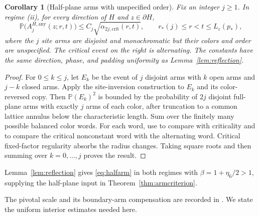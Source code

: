 \documentclass[11pt]{amsart}
\newtheorem{corollary}[theorem]{Corollary}
\theoremstyle{remark}
\newcommand{\Prob}{\mathbb P}
\begin{document}
\begin{corollary}[Half-plane arms with unspecified order]\label{cor:generalreflection}
Fix an integer $j\ge1$.  In regime (ii), for every direction of $H$ and
$z\in\partial H$,
\[
 \Prob\bigl(A_j^{H,\mathrm{any}}(z;r,t)\bigr)
 \le C_j\sqrt{\alpha_{2j,\mathrm{crit}}(r,t)},
 \qquad r_*(j)\le r<t\le L_\varepsilon(p_*),
\]
where the $j$ site arms are disjoint and monochromatic but their colors
and order are unspecified.  The critical event on the right is alternating.
The constants have the same direction, phase, and padding uniformity as
Lemma~\ref{lem:reflection}.
\end{corollary}
\begin{proof}
For $0\le k\le j$, let $E_k$ be the event of $j$ disjoint arms with
$k$ open arms and $j-k$ closed arms.
Apply the site-inversion construction to $E_k$ and its color-reversed
copy. Then $\Prob(E_k)^2$ is bounded by the probability of $2j$
disjoint full-plane arms with exactly $j$ arms of each color, after
truncation to a common lattice annulus below the characteristic length.
Sum over the finitely many possible balanced color words.  For each word,
use \cite[Theorem~27]{Nolin} to compare with criticality and
\cite[Proposition~20]{Nolin} to compare the critical nonconstant word
with the alternating word.  Critical fixed-factor regularity absorbs
the radius changes.  Taking square roots and then summing over
$k=0,\ldots,j$ proves the result.
\end{proof}

Lemma~\ref{lem:reflection} gives \eqref{eq:halfarm} in both regimes with $\beta=1+\eta_6/2>1$, supplying the half-plane input in Theorem~\ref{thm:armcriterion}.

The pivotal scale and its boundary-arm compensation are recorded in \cite[Remark~36, equation~(7.17)]{Nolin}. We state the uniform interior estimates needed here.
\end{document}
